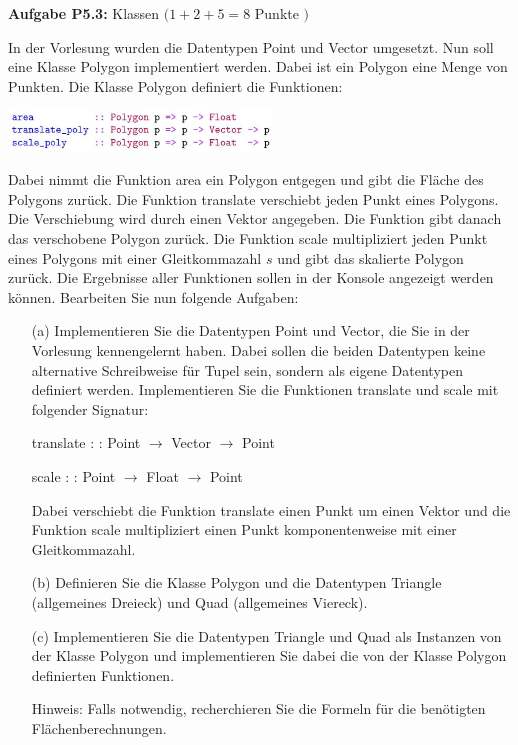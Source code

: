 \newpage

\textbf{Aufgabe P5.3:} Klassen $(1+2+5=8$ Punkte $)$

In der Vorlesung wurden die Datentypen Point und Vector umgesetzt. Nun soll eine Klasse Polygon implementiert werden. 
Dabei ist ein Polygon eine Menge von Punkten. Die Klasse Polygon definiert die Funktionen:

\includegraphics[width=7cm]{2022_11_15_0a5a2eee0aef383b0ce9g-2(1)}

Dabei nimmt die Funktion area ein Polygon entgegen und gibt die Fläche des Polygons zurück. Die Funktion translate 
verschiebt jeden Punkt eines Polygons. Die Verschiebung wird durch einen Vektor angegeben. Die Funktion gibt danach das verschobene 
Polygon zurück. Die Funktion scale multipliziert jeden Punkt eines Polygons mit einer Gleitkommazahl $s$ und gibt das skalierte Polygon 
zurück. Die Ergebnisse aller Funktionen sollen in der Konsole angezeigt werden können. Bearbeiten Sie nun folgende Aufgaben:

\begin{itemize}
  \item [(a)] Implementieren Sie die Datentypen Point und Vector, die Sie in der Vorlesung kennengelernt haben. Dabei sollen die beiden Datentypen keine alternative Schreibweise für Tupel sein, sondern als eigene Datentypen definiert werden. Implementieren Sie die Funktionen translate und scale mit folgender Signatur:

  translate : : Point $\rightarrow$ Vector $\rightarrow$ Point
  
  scale : : Point $\rightarrow$ Float $\rightarrow$ Point
  
  Dabei verschiebt die Funktion translate einen Punkt um einen Vektor und die Funktion scale multipliziert einen Punkt komponentenweise mit einer Gleitkommazahl.

  \item [(b)] Definieren Sie die Klasse Polygon und die Datentypen Triangle (allgemeines Dreieck) und Quad (allgemeines Viereck).

  \item [(c)] Implementieren Sie die Datentypen Triangle und Quad als Instanzen von der Klasse Polygon und implementieren Sie dabei die von der Klasse Polygon definierten Funktionen.

Hinweis: Falls notwendig, recherchieren Sie die Formeln für die benötigten Flächenberechnungen.

\newpage

\inputminted{Haskell}{A5_3.hs}
\end{itemize}

